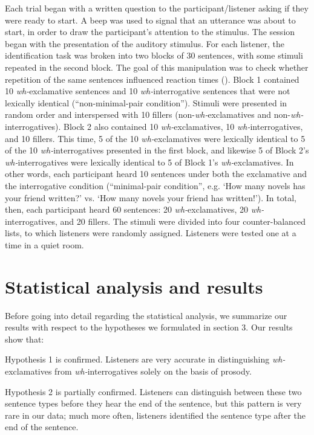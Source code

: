\documentclass[output=paper]{langsci/langscibook}
\begin{document}
Each trial began with a written question to the participant/listener asking if they were ready to start. A beep was used to signal that an utterance was about to start, in order to draw the participant’s attention to the stimulus. The session began with the presentation of the auditory stimulus. For each listener, the identification task was broken into two blocks of 30 sentences, with some stimuli repeated in the second block. The goal of this manipulation was to check whether repetition of the same sentences influenced reaction times (\citealt{Bentin1994}). Block 1 contained 10 \textit{wh-}exclamative sentences and 10 \textit{wh-}interrogative sentences that were not lexically identical (“non-minimal-pair condition”). Stimuli were presented in random order and interspersed with 10 fillers (non-\textit{wh-}exclamatives and non-\textit{wh-}interrogatives). Block 2 also contained 10 \textit{wh-}excla\-ma\-tives, 10 \textit{wh-}interrogatives, and 10 fillers. This time, 5 of the 10 \textit{wh-}exclamatives were lexically identical to 5 of the 10 \textit{wh-}interrogatives presented in the first block, and likewise 5 of Block 2’s \textit{wh-}interrogatives were lexically identical to 5 of Block 1’s \textit{wh-}exclamatives. In other words, each participant heard 10 sentences under both the exclamative and the interrogative condition (“minimal-pair condition”, e.g. ‘How many novels has your friend written?’ vs. ‘How many novels your friend has written!’). In total, then, each participant heard 60 sentences: 20 \textit{wh-}exclamatives, 20 \textit{wh-}interrogatives, and 20 fillers. The stimuli were divided into four counter-balanced lists, to which listeners were randomly assigned. Listeners were tested one at a time in a quiet room. 


\section{Statistical analysis and results}
\label{sec:kel:5}

Before going into detail regarding the statistical analysis, we summarize our results with respect to the hypotheses we formulated in section 3. Our results show that:

Hypothesis 1 is confirmed. Listeners are very accurate in distinguishing \textit{wh-}exclamatives from \textit{wh-}interrogatives solely on the basis of prosody. 

Hypothesis 2 is partially confirmed. Listeners can distinguish between these two sentence types before they hear the end of the sentence, but this pattern is very rare in our data; much more often, listeners identified the sentence type after the end of the sentence. 
\end{document}
